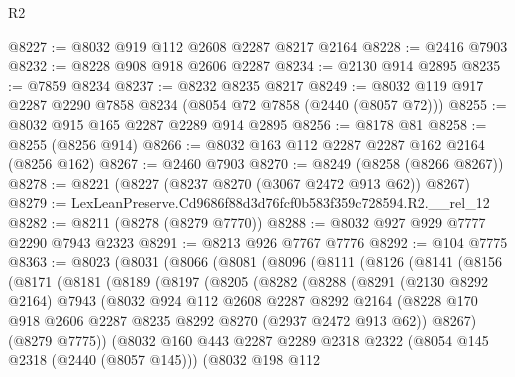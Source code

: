 \begin{lexlean}{R2}
\begin{coremodule}
@8227 := @8032 @919 @112 @2608 @2287 @8217 @2164
@8228 := @2416 @7903
@8232 := @8228 @908 @918 @2606 @2287
@8234 := @2130 @914 @2895
@8235 := @7859 @8234
@8237 := @8232 @8235 @8217
@8249 := @8032 @119 @917 @2287 @2290 @7858 @8234 (@8054 @72 @7858 (@2440 (@8057 @72)))
@8255 := @8032 @915 @165 @2287 @2289 @914 @2895
@8256 := @8178 @81
@8258 := @8255 (@8256 @914)
@8266 := @8032 @163 @112 @2287 @2287 @162 @2164 (@8256 @162)
@8267 := @2460 @7903
@8270 := @8249 (@8258 (@8266 @8267))
@8278 := @8221 (@8227 (@8237 @8270 (@3067 @2472 @913 @62)) @8267)
@8279 := LexLeanPreserve.Cd9686f88d3d76fcf0b583f359c728594.R2.__rel_12
@8282 := @8211 (@8278 (@8279 @7770))
@8288 := @8032 @927 @929 @7777 @2290 @7943 @2323
@8291 := @8213 @926 @7767 @7776
@8292 := @104 @7775
@8363 := @8023
    (@8031
      (@8066
        (@8081
          (@8096
            (@8111
              (@8126
                (@8141
                  (@8156
                    (@8171
                      (@8181
                        (@8189
                          (@8197
                            (@8205
                              (@8282
                                (@8288
                                  (@8291
                                    (@2130 @8292 @2164)
                                    @7943
                                    (@8032
                                      @924
                                      @112
                                      @2608
                                      @2287
                                      @8292
                                      @2164
                                      (@8228
                                        @170
                                        @918
                                        @2606
                                        @2287
                                        @8235
                                        @8292
                                        @8270
                                        (@2937 @2472 @913 @62))
                                      @8267)
                                    (@8279 @7775))
                                  (@8032
                                    @160
                                    @443
                                    @2287
                                    @2289
                                    @2318
                                    @2322
                                    (@8054 @145 @2318 (@2440 (@8057 @145)))
                                    (@8032
                                      @198
                                      @112

\end{coremodule}
\end{lexlean}
